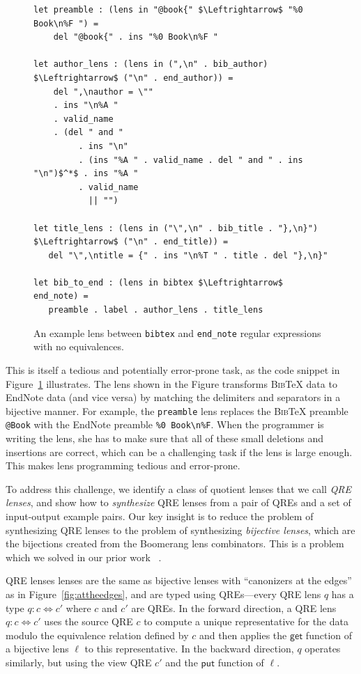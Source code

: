 \documentclass{svproc}
\newcommand{\cd}[1]{\lstinline[backgroundcolor=\color{white}]$#1$}
\newcommand{\kw}[1]{\ensuremath{\mathsf{#1}}}
\newcommand{\bibtex}{\textsc{Bib}\TeX{}}
\newcommand{\get}{\ensuremath{\kw{get}}}
\newcommand{\lput}{\ensuremath{\kw{put}}}
\begin{document}
\begin{figure}[t]
\begin{lstlisting}
let preamble : (lens in "@book{" $\Leftrightarrow$ "%0 Book\n%F ") = 
    del "@book{" . ins "%0 Book\n%F "
  
let author_lens : (lens in (",\n" . bib_author) $\Leftrightarrow$ ("\n" . end_author)) = 
    del ",\nauthor = \""
    . ins "\n%A "
    . valid_name
    . (del " and "
         . ins "\n"
         . (ins "%A " . valid_name . del " and " . ins "\n")$^*$ . ins "%A "
         . valid_name
           || "")
           
let title_lens : (lens in ("\",\n" . bib_title . "},\n}") $\Leftrightarrow$ ("\n" . end_title)) =
   del "\",\ntitle = {" . ins "\n%T " . title . del "},\n}" 
    
let bib_to_end : (lens in bibtex $\Leftrightarrow$ end_note) =
   preamble . label . author_lens . title_lens
\end{lstlisting}
\caption{An example lens between \cd{bibtex} and \cd{end_note} regular
expressions with no equivalences.}
\label{fig:example-lens}
\end{figure}

This is itself a tedious and potentially error-prone task, as the code snippet
in Figure~\ref{fig:example-lens} illustrates.  The lens shown in the Figure
transforms \bibtex{} data to EndNote data  (and vice versa) by matching
the delimiters and separators in a bijective manner. For example, the
\cd{preamble} lens replaces the \bibtex{} preamble \verb|@Book| with the EndNote
preamble \verb|%0 Book\n%F|. When the programmer is writing the lens, she has
to make sure that all of these small deletions and insertions are correct,
which can be a challenging task if the lens is large enough. This makes lens
programming tedious and error-prone.

To address this challenge, we identify a  class of quotient lenses that we call
{\em QRE lenses}, and show how to {\em synthesize} QRE lenses from a pair of
QREs and a set of input-output example pairs. Our key insight is to reduce the
problem of synthesizing QRE lenses to the problem of synthesizing {\em
bijective lenses}, which are the bijections created from the Boomerang lens
combinators. This is a problem which we solved in our prior work ~\cite{popl18}.

QRE lenses lenses are the same as bijective lenses with ``canonizers at the
edges'' as in Figure~\ref{fig:attheedges}, and are typed using QREs---every QRE
lens $q$ has a type $q: c \Leftrightarrow c'$ where $c$ and $c'$ are QREs.
In the forward direction, a QRE lens $q: c \Leftrightarrow c'$ uses the source
QRE $c$ to compute a unique representative for the data modulo the equivalence
relation defined by $c$ and then applies the $\get$ function of a bijective
lens $\ell$ to this representative. In the backward direction, $q$ operates
similarly,  but using the view QRE $c'$ and the $\lput$ function of $\ell$.
\end{document}
